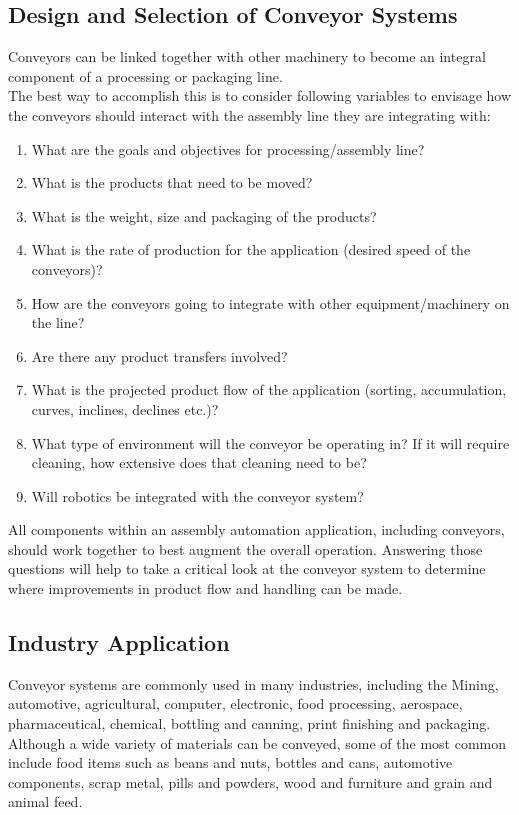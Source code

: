 \documentclass[11pt]{article}
\begin{document}
\subsection{Design and Selection of Conveyor Systems}

Conveyors can be linked together with other machinery to become an integral component of a processing or packaging line. \\
The best way to accomplish this is to consider following variables to envisage how the conveyors should interact with the assembly line they are integrating with:

\begin{enumerate}
	\item What are the goals and objectives for processing/assembly line?
	\item What is the products that need to be moved?
	\item What is the weight, size and packaging of the products?
	\item What is the rate of production for the application (desired speed of the conveyors)?
	\item How are the conveyors going to integrate with other equipment/machinery on the line?
	\item Are there any product transfers involved?
	\item What is the projected product flow of the application (sorting, accumulation, curves, inclines, declines etc.)?
	\item What type of environment will the conveyor be operating in? If it will require cleaning, how extensive does that cleaning need to be?
	\item Will robotics be integrated with the conveyor system?
\end{enumerate}


All components within an assembly automation application, including conveyors, should work together to best augment the overall operation. Answering those questions will help to take a critical look at the conveyor system to determine where improvements in product flow and handling can be made.

\subsection{Industry Application}

Conveyor systems are commonly used in many industries, including the Mining, automotive,
agricultural, computer, electronic, food processing, aerospace, pharmaceutical, chemical, bottling and canning, print finishing and packaging. Although a wide variety of materials can be conveyed, some of the most common include food items such as beans and nuts, bottles and cans, automotive components, scrap metal, pills and powders, wood and furniture and grain and animal feed. \\
\end{document}

